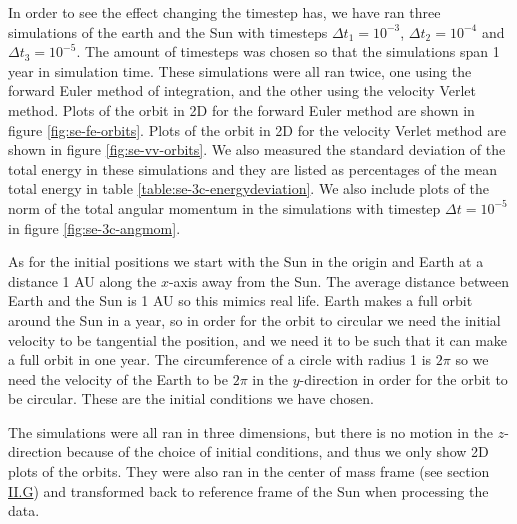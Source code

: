 \documentclass[reprint,english,notitlepage]{revtex4-1}  %
\begin{document}
In order to see the effect changing the timestep has, we have ran three simulations of the earth and the Sun with timesteps $\Delta t_1 = 10^{-3}$, $\Delta t_2 = 10^{-4}$ and $\Delta t_3 = 10^{-5}$. The amount of timesteps was chosen so that the simulations span 1 year in simulation time. These simulations were all ran twice, one using the forward Euler method of integration, and the other using the velocity Verlet method. Plots of the orbit in 2D for the forward Euler method are shown in figure \ref{fig:se-fe-orbits}. Plots of the orbit in 2D for the velocity Verlet method are shown in figure \ref{fig:se-vv-orbits}. We also measured the standard deviation of the total energy in these simulations and they are listed as percentages of the mean total energy in table \ref{table:se-3c-energydeviation}. We also include plots of the norm of the total angular momentum in the simulations with timestep $\Delta t = 10^{-5}$ in figure \ref{fig:se-3c-angmom}.

As for the initial positions we start with the Sun in the origin and Earth at a distance 1 AU along the $x$-axis away from the Sun. The average distance between Earth and the Sun is 1 AU so this mimics real life. Earth makes a full orbit around the Sun in a year, so in order for the orbit to circular we need the initial velocity to be tangential the position, and we need it to be such that it can make a full orbit in one year. The circumference of a circle with radius 1 is $2\pi$ so we need the velocity of the Earth to be $2\pi$ in the $y$-direction in order for the orbit to be circular. These are the initial conditions we have chosen. 

The simulations were all ran in three dimensions, but there is no motion in the $z$-direction because of the choice of initial conditions, and thus we only show 2D plots of the orbits. They were also ran in the center of mass frame (see section \hyperref[sec:II:g]{II.G}) and transformed back to reference frame of the Sun when processing the data.
\end{document}
